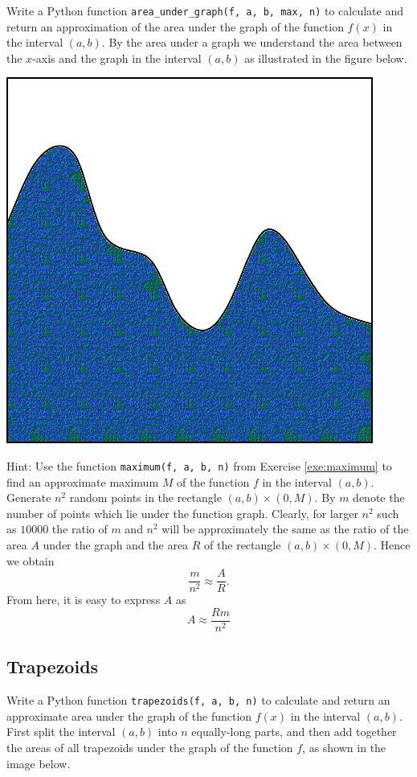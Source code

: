 Write a Python function {\tt area\_under\_graph(f, a, b, max, n)} to calculate and return  
an approximation of the area under the graph of the function $f(x)$ in the interval $(a, b)$. By the area
under a graph we understand the area between the $x$-axis and the 
graph in the interval $(a, b)$ as illustrated in the figure below. 

\begin{center}
\includegraphics[height=0.3\textwidth]{img/prob2.png}
\end{center}
\noindent
Hint: Use the function {\tt maximum(f, a, b, n)} from Exercise \ref{exe:maximum}
to find an approximate maximum $M$ of the function $f$ in the interval $(a,b)$. 
Generate $n^2$ random points in the rectangle $(a, b)\times(0, M)$. By $m$ denote 
the number of points which lie under the function graph. Clearly, for larger
$n^2$ such as $10000$ the ratio of $m$ and $n^2$ will be approximately the same as 
the ratio of the area $A$ under the graph and the area $R$ of the rectangle $(a, b)\times(0, M)$. 
Hence we obtain 
$$
\frac{m}{n^2} \approx \frac{A}{R}.
$$
From here, it is easy to express $A$ as
$$
A \approx \frac{Rm}{n^2}
$$


\subsection{Trapezoids}\label{exe:trap}

Write a Python function {\tt trapezoids(f, a, b, n)} to calculate and return  
an approximate area under the graph of the function $f(x)$ in the interval $(a, b)$. 
First split the interval $(a, b)$ into $n$
equally-long parts, and then add together the areas of all trapezoids under the 
graph of the function $f$, as shown in the image below. 

